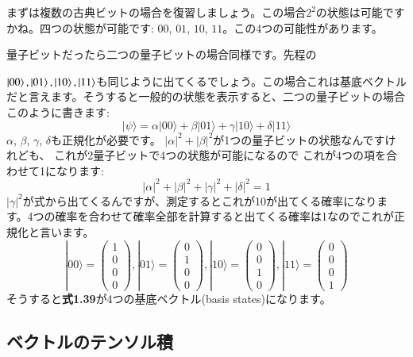 まずは複数の古典ビットの場合を復習しましょう。この場合$2^2$の状態は可能ですかね。四つの状態が可能です: $00$, $01$, $10$, $11$。この4つの可能性があります。

量子ビットだったら二つの量子ビットの場合同様です。先程の

$\ket{00}, \ket{01}, \ket{10}, \ket{11}$も同じように出てくるでしょう。この場合これは基底ベクトルだと言えます。そうすると一般的の状態を表示すると、二つの量子ビットの場合このように書きます:
\begin{equation}
|\psi\rangle=\alpha|00\rangle+\beta|01\rangle+\gamma|10\rangle+\delta|11\rangle
\end{equation}
$\alpha$, $\beta$, $\gamma$, $\delta$も正規化が必要です。
$|\alpha|^2 + |\beta|^2$が1つの量子ビットの状態なんですけれども、
これが2量子ビットで4つの状態が可能になるので
これが4つの項を合わせて1になります:
\begin{equation}
|\alpha|^{2}+|\beta|^{2}+|\gamma|^{2}+|\delta|^{2}=1
\end{equation}
$|\gamma|^2$が式から出てくるんですが、測定するとこれが10が出てくる確率になります。4つの確率を合わせて確率全部を計算すると出てくる確率は1なのでこれが正規化と言います。
\begin{equation}
|00\rangle=\left(\begin{array}{l}
1 \\
0 \\
0 \\
0
\end{array}\right),|01\rangle=\left(\begin{array}{l}
0 \\
1 \\
0 \\
0
\end{array}\right),|10\rangle=\left(\begin{array}{l}
0 \\
0 \\
1 \\
0
\end{array}\right),|11\rangle=\left(\begin{array}{l}
0 \\
0 \\
0 \\
1
\end{array}\right)
\end{equation}
そうすると\textbf{式1.39}が4つの基底ベクトル(basis states)になります。
\subsection{ベクトルのテンソル積}

